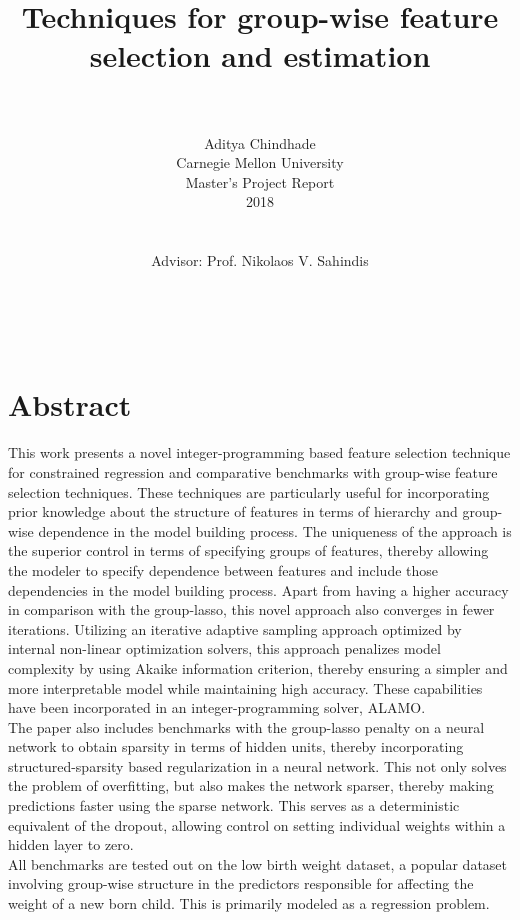 \documentclass[a4paper,12pt]{article}
\title{Techniques for group-wise feature selection and estimation}
\date{}
\author{
\\
\\
Aditya Chindhade
\\ Carnegie Mellon University
\\ Master's Project Report
\\ 2018
\\
\\
\\Advisor: Prof. Nikolaos V. Sahindis 
}
\begin{document}
	\maketitle

	\newpage
	\tableofcontents \\


	\newpage
	\section{Abstract}
	This work presents a novel integer-programming based feature selection technique for constrained regression and comparative benchmarks with group-wise feature selection techniques. These techniques are particularly useful for incorporating prior knowledge about the structure of features in terms of hierarchy and group-wise dependence in the model building process. The uniqueness of the approach is the superior control in terms of specifying groups of features, thereby allowing the modeler to specify dependence between features and include those dependencies in the model building process. Apart from having a higher accuracy in comparison with the group-lasso, this novel approach also converges in fewer iterations. Utilizing an iterative adaptive sampling approach optimized by internal non-linear optimization solvers, this approach penalizes model complexity by using Akaike information criterion, thereby ensuring a simpler and more interpretable model while maintaining high accuracy. These capabilities have been incorporated in an integer-programming solver, ALAMO. \\
    The paper also includes benchmarks with the group-lasso penalty on a neural network to obtain sparsity in terms of hidden units, thereby incorporating structured-sparsity based regularization in a neural network. This not only solves the problem of overfitting, but also makes the network sparser, thereby making predictions faster using the sparse network. This serves as a deterministic equivalent of the dropout, allowing control on setting individual weights within a hidden layer to zero. \\
    All benchmarks are tested out on the low birth weight dataset, a popular dataset involving group-wise structure in the predictors responsible for affecting the weight of a new born child. This is primarily modeled as a regression problem.
	\newpage
\end{document}

